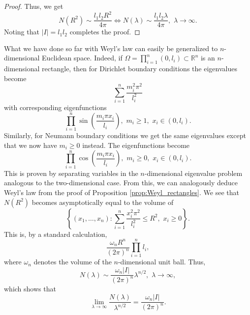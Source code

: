 \documentclass{amsart}
\theoremstyle{definition}
\newcommand*{\R}{\mathbb{R}}
\begin{document}
\begin{proof}
Thus, we get
    \begin{equation*}
        N(R^2) \sim \frac{l_1l_2R^2}{4\pi} \iff 
        N(\lambda) \sim \frac{l_1l_2\lambda}{4\pi}, \,\,\lambda \to \infty.
    \end{equation*}
    Noting that $|I| = l_1l_2$ completes the proof. 
\end{proof}

What we have done so far with Weyl's law can easily be generalized to $n$-dimensional Euclidean space. Indeed, if $\Omega = \prod_{i=1}^n (0,l_i) \subset \R^n$ is an $n$-dimensional rectangle, then for Dirichlet boundary conditions the eigenvalues become
\begin{equation*}
    \sum_{i = 1}^n \frac{m_i^2\pi^2}{l_i^2}
\end{equation*}
with corresponding eigenfunctions
\begin{equation*}
    \prod_{i=1}^n \sin(\frac{m_i \pi x_i}{l_i}), \,\, m_i \geq 1, \,\, x_i \in (0, l_i).
\end{equation*}
Similarly, for Neumann boundary conditions we get the same eigenvalues except that we now have $m_i \geq 0$ instead. The eigenfunctions become
\begin{equation*}
    \prod_{i=1}^n \cos(\frac{m_i \pi x_i}{l_i}), \,\, m_i \geq 0, \,\, x_i \in (0, l_i).
\end{equation*}
This is proven by separating variables in the $n$-dimensional eigenvalue problem analogous to the two-dimensional case. From this, we can analogously deduce Weyl's law from the proof of Proposition \ref{prop:Weyl_rectangles}.  We see that $N(R^2)$ becomes asymptotically equal to the volume of 
\begin{equation*}
    \left\{(x_1,\dots,x_n) : \sum_{i=1}^n \frac{x_i^2\pi^2}{l_i^2} \leq R^2, \,\, x_i \geq 0\right\}.
\end{equation*}
This is, by a standard calculation,
\begin{equation*}
    \frac{\omega_nR^n}{(2\pi)^n} \prod_{i=1}^n l_i,
\end{equation*}
where $\omega_n$ denotes the volume of the $n$-dimensional unit ball.
Thus,
\begin{equation*}
    N(\lambda) \sim \frac{\omega_n|I|}{(2\pi)^n}\lambda^{n/2}, \,\, \lambda \to \infty,
\end{equation*}
which shows that
\begin{equation*}
    \lim_{\lambda \to \infty} \frac{N(\lambda)}{\lambda^{n/2}} = \frac{\omega_n|I|}{(2\pi)^n}.
\end{equation*}
\end{document}
